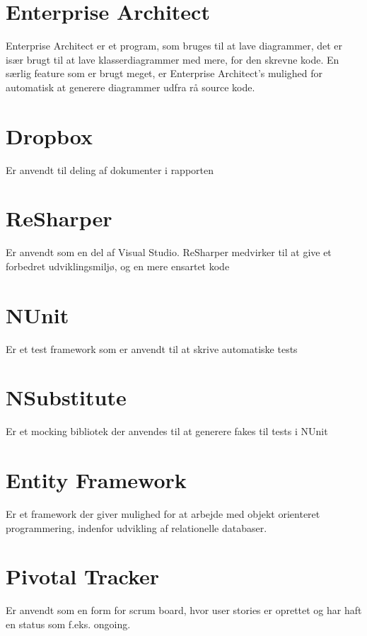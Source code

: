 \section*{Enterprise Architect}
Enterprise Architect er et program, som bruges til at lave diagrammer, det er især brugt til at lave klasserdiagrammer med mere, for den skrevne kode. En særlig feature som er brugt meget, er Enterprise Architect's mulighed for automatisk at generere diagrammer udfra rå source kode.

\section*{Dropbox}
Er anvendt til deling af dokumenter i rapporten

\section*{ReSharper} %
Er anvendt som en del af Visual Studio. ReSharper medvirker til at give et forbedret udviklingsmiljø, og en mere ensartet kode 

\section*{NUnit}
Er et test framework som er anvendt til at skrive automatiske tests

\section*{NSubstitute}
Er et mocking bibliotek der anvendes til at generere fakes til tests i NUnit

\section*{Entity Framework}
Er et framework der giver mulighed for at arbejde med objekt orienteret programmering, indenfor udvikling af relationelle databaser. 

\section*{Pivotal Tracker}
Er anvendt som en form for scrum board, hvor user stories er oprettet og har haft en status som f.eks. ongoing. 

